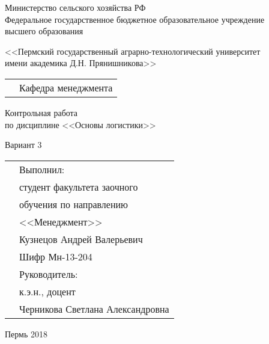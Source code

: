 \thispagestyle{empty}
\begin{center}
	Министерство сельского хозяйства РФ \\Федеральное государственное бюджетное образовательное учреждение\\ высшего образования
	
	<<Пермский государственный аграрно-технологический университет\\ имени академика Д.Н. Прянишникова>>
\end{center}
\vspace{10ex}
\begin{tabularx}{\textwidth}{XX}
	& Кафедра менеджмента \\
\end{tabularx}
\begin{center}
	\vspace{13ex}
	Контрольная работа\\
	по дисциплине <<Основы логистики>> \\
	\vspace{1ex}
	
	Вариант 3
\end{center}
	\vspace{8ex}
	\begin{tabularx}{\textwidth}{XX}
	& Выполнил:\\
	& студент факультета заочного \\
	& обучения по направлению \\
	& <<Менеджмент>> \\
	& Кузнецов Андрей Валерьевич \\
	& Шифр Мн-13-204\\
	& Руководитель:\\
	& к.э.н., доцент\\
	& Черникова Светлана Александровна\\
	\end{tabularx}
\begin{center}
	\vfill
	Пермь 2018
\end{center}
